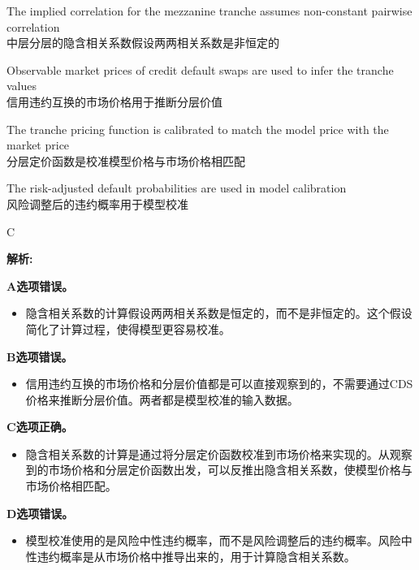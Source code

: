 \documentclass{article}
\newenvironment{explanation}
{\textbf{解析:}\par}
{\par}
\begin{document}
\begin{choices}
    \item The implied correlation for the mezzanine tranche assumes non-constant pairwise correlation\\
    中层分层的隐含相关系数假设两两相关系数是非恒定的
    \item Observable market prices of credit default swaps are used to infer the tranche values\\
    信用违约互换的市场价格用于推断分层价值
    \item The tranche pricing function is calibrated to match the model price with the market price\\
    分层定价函数是校准模型价格与市场价格相匹配
    \item The risk-adjusted default probabilities are used in model calibration\\
    风险调整后的违约概率用于模型校准
\end{choices}

\begin{correctanswer}
    C
\end{correctanswer}

\begin{explanation}
    \textbf{A选项错误。}
    \begin{itemize}
    \item 隐含相关系数的计算假设两两相关系数是恒定的，而不是非恒定的。这个假设简化了计算过程，使得模型更容易校准。
    \end{itemize}

    \textbf{B选项错误。}
    \begin{itemize}
    \item 信用违约互换的市场价格和分层价值都是可以直接观察到的，不需要通过CDS价格来推断分层价值。两者都是模型校准的输入数据。
    \end{itemize}

    \textbf{C选项正确。}
    \begin{itemize}
    \item 隐含相关系数的计算是通过将分层定价函数校准到市场价格来实现的。从观察到的市场价格和分层定价函数出发，可以反推出隐含相关系数，使模型价格与市场价格相匹配。
    \end{itemize}

    \textbf{D选项错误。}
    \begin{itemize}
    \item 模型校准使用的是风险中性违约概率，而不是风险调整后的违约概率。风险中性违约概率是从市场价格中推导出来的，用于计算隐含相关系数。
    \end{itemize}
\end{explanation}
\end{document}
